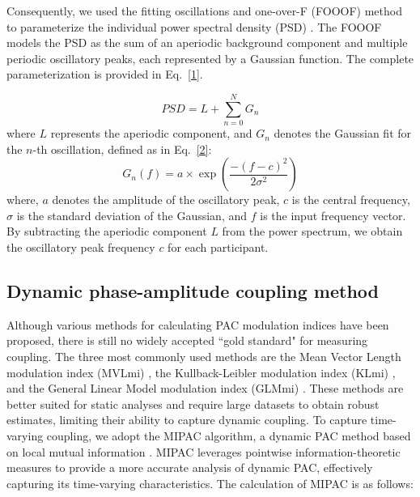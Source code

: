 \documentclass[lettersize,journal]{IEEEtran}
\begin{document}
Consequently, we used the fitting oscillations and one-over-F (FOOOF) method to parameterize the individual power spectral density (PSD) \cite{donoghue2020parameterizing}. The FOOOF models the PSD as the sum of an aperiodic background component and multiple periodic oscillatory peaks, each represented by a Gaussian function. The complete parameterization is provided in Eq.~\eqref{1}.
 
\begin{equation}
PSD = L + \sum_{n=0}^N G_n
\label{1}
\end{equation}
where \(L\) represents the aperiodic component, and \(G_n\) denotes the Gaussian fit for the \(n\)-th oscillation, defined as in Eq.~\eqref{2}:
\begin{equation}
G_n(f) = a \times \exp \left( \frac{-(f - c)^2}{2 \sigma^2} \right)
\label{2}
\end{equation}
where, \(a\) denotes the amplitude of the oscillatory peak, \(c\) is the central frequency, \(\sigma\) is the standard deviation of the Gaussian, and \(f\) is the input frequency vector. By subtracting the aperiodic component \(L\) from the power spectrum, we obtain the oscillatory peak frequency \(c\) for each participant.


\subsection{Dynamic phase-amplitude coupling method}

Although various methods for calculating PAC modulation indices have been proposed, there is still no widely accepted ``gold standard" for measuring coupling. The three most commonly used methods are the Mean Vector Length modulation index (MVLmi)  \cite{canolty2006high}, the Kullback-Leibler modulation index (KLmi)  \cite{tort2010measuring}, and the General Linear Model modulation index (GLMmi)  \cite{bruns2004task}.
These methods are better suited for static analyses and require large datasets to obtain robust estimates, limiting their ability to capture dynamic coupling. To capture time-varying coupling, we adopt the MIPAC algorithm, a dynamic PAC method based on local mutual information \cite{martinez2019measuring}. MIPAC leverages pointwise information-theoretic measures to provide a more accurate analysis of dynamic PAC, effectively capturing its time-varying characteristics. The calculation of MIPAC is as follows:
\end{document}
